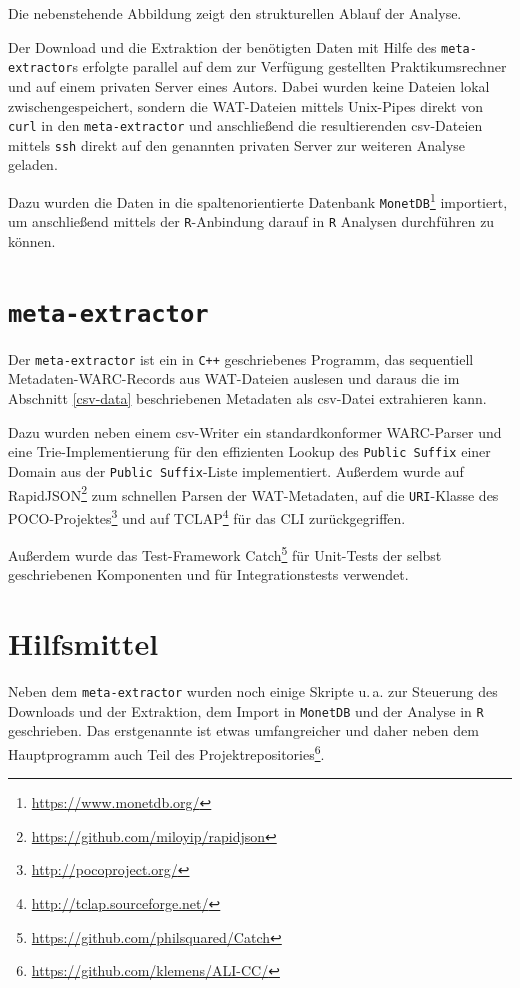 \documentclass[a4paper,12pt,titlepage=false]{scrreprt}
\begin{document}
Die nebenstehende Abbildung zeigt den strukturellen Ablauf der Analyse.

Der Download und die Extraktion der benötigten Daten mit Hilfe des
\texttt{meta-extractor}s erfolgte parallel auf dem zur Verfügung gestellten
Praktikumsrechner und auf einem privaten Server eines Autors. Dabei wurden keine
Dateien lokal zwischengespeichert, sondern die WAT-Dateien mittels Unix-Pipes
direkt von \texttt{curl} in den \texttt{meta-extractor} und anschließend die
resultierenden csv-Dateien mittels \texttt{ssh} direkt auf den genannten
privaten Server zur weiteren Analyse geladen.

Dazu wurden die Daten in die spaltenorientierte Datenbank
\texttt{MonetDB}\footnote{\url{https://www.monetdb.org/}} importiert, um
anschließend mittels der \texttt{R}-Anbindung darauf in \texttt{R} Analysen
durchführen zu können.

\section{\texttt{meta-extractor}}

Der \texttt{meta-extractor} ist ein in \texttt{C++} geschriebenes Programm,
das sequentiell Metadaten-WARC-Records aus WAT-Dateien auslesen und daraus
die im Abschnitt \ref{csv-data} beschriebenen Metadaten als csv-Datei extrahieren
kann.

Dazu wurden neben einem csv-Writer ein standardkonformer WARC-Parser und eine
Trie-Implementierung für den effizienten Lookup des \texttt{Public Suffix} einer
Domain aus der \texttt{Public Suffix}-Liste implementiert.
Außerdem wurde auf RapidJSON\footnote{\url{https://github.com/miloyip/rapidjson}}
zum schnellen Parsen der WAT-Metadaten, auf die \texttt{URI}-Klasse des
POCO-Projektes\footnote{\url{http://pocoproject.org/}} und auf
TCLAP\footnote{\url{http://tclap.sourceforge.net/}} für das CLI zurückgegriffen.

Außerdem wurde das Test-Framework
Catch\footnote{\url{https://github.com/philsquared/Catch}} für Unit-Tests der
selbst geschriebenen Komponenten und für Integrationstests verwendet.

\section{Hilfsmittel}

Neben dem \texttt{meta-extractor} wurden noch einige Skripte u.\,a. zur
Steuerung des Downloads und der Extraktion, dem Import in \texttt{MonetDB} und
der Analyse in \texttt{R} geschrieben. Das erstgenannte ist etwas umfangreicher
und daher neben dem Hauptprogramm auch Teil des
Projektrepositories\footnote{\url{https://github.com/klemens/ALI-CC/}}.
\end{document}
